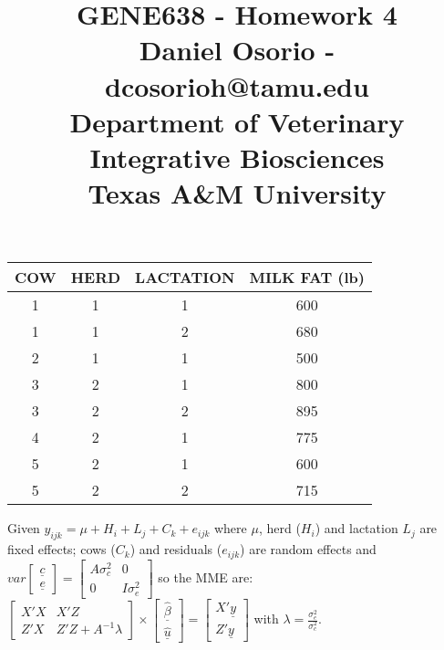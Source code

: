 \documentclass[12pt,a4paper]{paper}
\begin{document}
\title{GENE638 - Homework 4\\\small{Daniel Osorio - dcosorioh@tamu.edu\\Department of Veterinary Integrative Biosciences\\Texas A\&M University}}
\maketitle

\begin{center}
\begin{tabular}{|c|c|c|c|}
\hline
COW&HERD&LACTATION&MILK FAT (lb)\\
\hline
1&1&1&600\\
\hline
1&1&2&680\\
\hline
2&1&1&500\\
\hline
3&2&1&800\\
\hline
3&2&2&895\\
\hline
4&2&1&775\\
\hline
5&2&1&600\\
\hline
5&2&2&715\\
\hline
\end{tabular}
\end{center}
Given $y_{ijk} = \mu + H_{i} + L_{j} + C_{k} + e_{ijk}$ where $\mu$, herd ($H_{i}$) and lactation $L_{j}$ are fixed effects; cows ($C_{k}$) and residuals ($e_{ijk}$) are random effects and $var\left[\begin{array}{c}\underline{c}\\\underline{e}\end{array}\right] = \left[\begin{array}{cc}A\sigma^{2}_{c}&0\\0&I\sigma^{2}_{e}\end{array}\right]$ so the MME are: $\left[\begin{array}{cc}X'X&X'Z\\Z'X&Z'Z+A^{-1}\lambda\end{array}\right]\times \left[\begin{array}{c}\underline{\hat{\beta}}\\\underline{\hat{u}}\end{array}\right]=\left[\begin{array}{c}X'\underline{y}\\Z'\underline{y}\end{array}\right]$ with $\lambda = \frac{\sigma^{2}_{e}}{\sigma^{2}_{c}}$.
\end{document}
